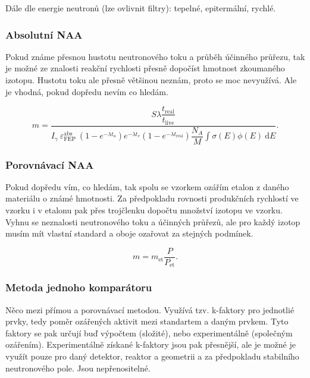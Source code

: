 Dále dle energie neutronů (lze ovlivnit filtry): tepelné, epitermální, rychlé.

\subsubsection{Absolutní NAA}

Pokud známe přesnou hustotu neutronového toku a průběh účinného průřezu, tak je možné ze znalosti reakční rychlosti přesně dopočíst hmotnost zkoumaného izotopu. Hustotu toku ale přesně většinou neznám, proto se moc nevyužívá. Ale je vhodná, pokud dopředu nevím co hledám.

\begin{equation}
    \boxed{
        m = \dfrac{S \lambda \dfrac{t_\text{real}}{t_\text{live}}}{I_\gamma \: \varepsilon_\text{FEP}^\text{abs} \: \left( 1 - e^{-\lambda t_a} \right) e^{-\lambda t_v} \left( 1 - e^{-\lambda t_\text{real}} \right) \dfrac{N_A}{M} \int \sigma(E) \phi(E) \: \text{d}E}.
    }
\end{equation}

\subsubsection{Porovnávací NAA}

Pokud dopředu vím, co hledám, tak spolu se vzorkem ozářím etalon z daného materiálu o známé hmotnosti. Za předpokladu rovnosti produkčních rychlostí ve vzorku i v etalonu pak přes trojčlenku dopočtu množství izotopu ve vzorku. Vyhnu se neznalosti neutronového toku a účinných průřezů, ale pro každý izotop musím mít vlastní standard a oboje ozařovat za stejných podmínek.

\begin{equation}
    \boxed{
        m = m_\text{et} \dfrac{P}{P_\text{et}}.
    }
\end{equation}

\subsubsection{Metoda jednoho komparátoru}

Něco mezi přímou a porovnávací metodou. Využívá tzv. k-faktory pro jednotlié prvky, tedy poměr ozářených aktivit mezi standartem a daným prvkem. Tyto faktory se pak určují buď výpočtem (složité), nebo experimentálně (společným ozářením). Experimentálně získané k-faktory jsou pak přesnější, ale je možné je využít pouze pro daný detektor, reaktor a geometrii a za předpokladu stabilního neutronového pole. Jsou nepřenositelné.

